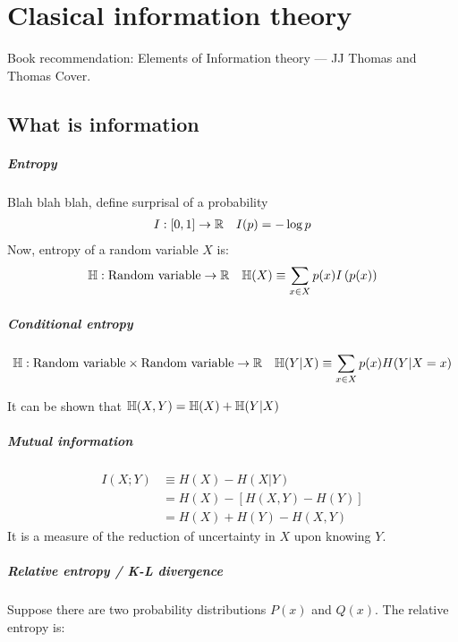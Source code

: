 \chapter{Clasical information theory}
Book recommendation: Elements of Information theory --- JJ Thomas and Thomas Cover.

\section{What is information}
\paragraph{Entropy}
Blah blah blah, define surprisal of a probability 
\begin{align*}
    I: [0, 1] \rightarrow \mathbb{R} \quad
    I(p) = - \log p
\end{align*}
Now, entropy of a random variable $X$ is:
\begin{align*}
    \mathbb{H} : \text{Random variable} \rightarrow \mathbb{R} \quad
    \mathbb{H}(X) \equiv \sum_{x \in X} p(x) I\left(p(x)\right)
\end{align*}

\paragraph{Conditional entropy}
\begin{align*}
    &\mathbb{H} : \text{Random variable} \times \text{Random variable} \rightarrow \mathbb{R} \quad
    \mathbb{H}(Y|X) \equiv \sum_{x \in X} p(x) H(Y|X=x) \\
\end{align*}

It can be shown that
    $\mathbb{H}(X, Y) = \mathbb{H}(X) + \mathbb{H}(Y|X)$
\paragraph{Mutual information}
\begin{align*}
    I(X; Y) &\equiv H(X) - H(X|Y) \\
            &= H(X) - [H(X, Y) - H(Y)] \\
            &= H(X) + H(Y) - H(X, Y) 
\end{align*}
It is a measure of the reduction of uncertainty in $X$ upon knowing $Y$.

\paragraph{Relative entropy / K-L divergence}
Suppose there are two probability distributions $P(x)$ and $Q(x)$. The
relative entropy is:

